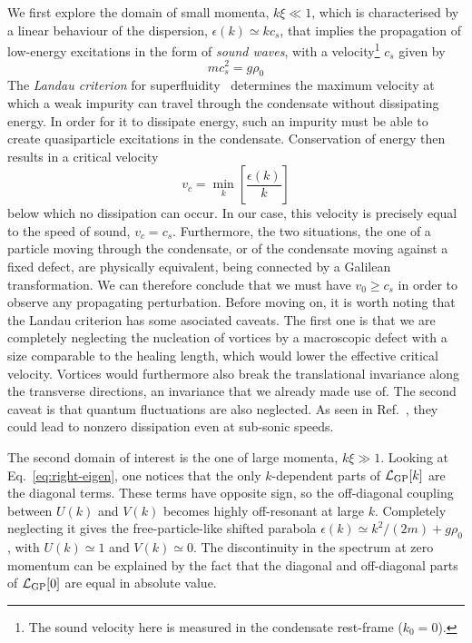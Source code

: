 We first explore the domain of small momenta, $k\xi \ll 1$, which is
characterised by a linear behaviour of the dispersion,
$\epsilon(k) \simeq k c_s$, that implies the propagation of low-energy
excitations in the form of \textit{sound waves}, with a
velocity\footnote{The sound velocity here is measured in the
  condensate rest-frame ($k_0 = 0$).} $c_s$ given by
%
\begin{equation}\label{eq:sound-velocity}
  mc^2_s = g \rho_0
\end{equation}
% 
The \textit{Landau criterion} for superfluidity~\cite{9780198507192}
determines the maximum velocity at which a weak impurity can travel
through the condensate without dissipating energy. In order for it to
dissipate energy, such an impurity must be able to create
quasiparticle excitations in the condensate. Conservation of energy
then results in a critical velocity
%
\begin{equation}\label{eq:Landau}
  v_c=\min_{k} \left[\frac{\epsilon(k)}{k}\right]
\end{equation}
% 
below which no dissipation can occur. In our case, this velocity is
precisely equal to the speed of sound, $v_c =
c_s$. Furthermore, the two situations, the one of a particle moving
through the condensate, or of the condensate moving against a fixed
defect, are physically equivalent, being connected by a Galilean
transformation. We can therefore conclude that we must have
$v_0 \geq c_s$ in order to observe any propagating
perturbation. Before moving on, it is worth noting that the Landau
criterion has some asociated caveats. The first one is that we are
completely neglecting the nucleation of vortices by a macroscopic
defect with a size comparable to the healing length, which would lower
the effective critical velocity. Vortices would furthermore also break
the translational invariance along the transverse directions, an
invariance that we already made use of. The second caveat is that
quantum fluctuations are also neglected. As seen in
Ref.~\cite{Astrakharchik_2004}, they could lead to nonzero dissipation
even at sub-sonic speeds.

The second domain of interest is the one of large momenta,
$k\xi \gg 1$. Looking at Eq.~\eqref{eq:right-eigen}, one notices that
the only $k$-dependent parts of $\mathcal{L}_{\text{GP}} [k]$ are the
diagonal terms. These terms have opposite sign, so the off-diagonal
coupling between $U(k)$ and $V(k)$ becomes highly off-resonant at
large $k$. Completely neglecting it gives the free-particle-like
shifted parabola $\epsilon(k) \simeq k^2/(2m)+g\rho_0$, with
$U(k) \simeq 1$ and $V(k) \simeq 0$.
%
The discontinuity in the spectrum at zero momentum can be explained by
the fact that the diagonal and off-diagonal parts of $\mathcal{L}_{\text{GP}}
[0]$ are equal in absolute value.

